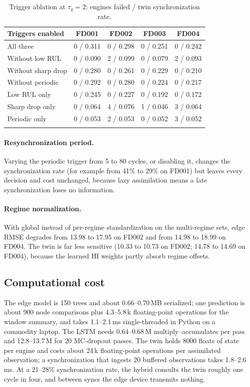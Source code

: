 \documentclass[pdflatex,sn-mathphys-num]{sn-jnl}
\begin{document}
\begin{table}[t]
\caption{Trigger ablation at $\tau_g = 2$: engines failed / twin synchronization rate.}\label{tab:triggers}
\begin{tabular*}{\textwidth}{@{\extracolsep\fill}lcccc}
\toprule
Triggers enabled & FD001 & FD002 & FD003 & FD004 \\
\midrule
All three             & 0 / 0.311 & 0 / 0.298 & 0 / 0.251 & 0 / 0.242 \\
Without low RUL       & 0 / 0.090 & 2 / 0.099 & 0 / 0.079 & 2 / 0.093 \\
Without sharp drop    & 0 / 0.280 & 0 / 0.261 & 0 / 0.229 & 0 / 0.210 \\
Without periodic      & 0 / 0.292 & 0 / 0.280 & 0 / 0.224 & 0 / 0.217 \\
Low RUL only          & 0 / 0.245 & 0 / 0.227 & 0 / 0.192 & 0 / 0.172 \\
Sharp drop only       & 0 / 0.064 & 4 / 0.076 & 1 / 0.046 & 3 / 0.064 \\
Periodic only         & 0 / 0.053 & 2 / 0.053 & 0 / 0.052 & 3 / 0.052 \\
\botrule
\end{tabular*}
\end{table}

\paragraph{Resynchronization period.} Varying the periodic trigger from 5 to 80 cycles, or disabling it, changes the synchronization rate (for example from 41\% to 29\% on FD001) but leaves every decision and cost unchanged, because lazy assimilation means a late synchronization loses no information.

\paragraph{Regime normalization.} With global instead of per-regime standardization on the multi-regime sets, edge RMSE degrades from 13.98 to 17.95 on FD002 and from 14.98 to 18.99 on FD004. The twin is far less sensitive (10.33 to 10.73 on FD002; 14.78 to 14.69 on FD004), because the learned HI weights partly absorb regime offsets.

\subsection{Computational cost}
The edge model is 150 trees and about 0.66--0.70\,MB serialized; one prediction is about 900 node comparisons plus 4.3--5.8\,k floating-point operations for the window summary, and takes 1.1--2.1\,ms single-threaded in Python on a commodity laptop. The LSTM needs 0.64--0.68\,M multiply--accumulates per pass and 12.8--13.7\,M for 20 MC-dropout passes. The twin holds 8000 floats of state per engine and costs about 24\,k floating-point operations per assimilated observation; a synchronization that ingests 20 buffered observations takes 1.8--2.6\,ms. At a 21--28\% synchronization rate, the hybrid consults the twin roughly one cycle in four, and between syncs the edge device transmits nothing.
\end{document}
